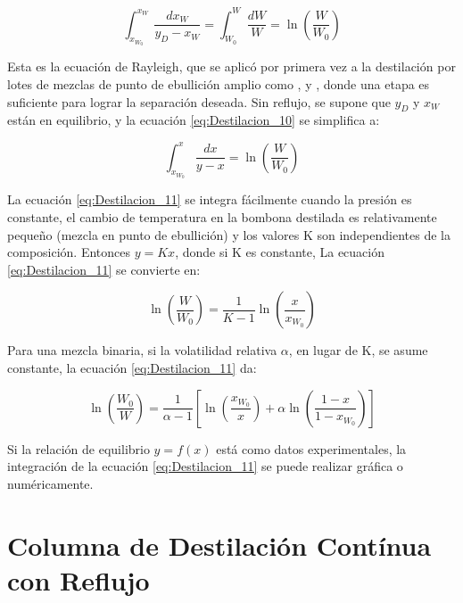 \documentclass[11pt]{book}
\begin{document}
\begin{equation}
    \label{eq:Destilacion_10}
    \int_{x_{W_0}}^{x_W} \frac{dx_W}{y_D-x_W} = \int_{W_0}^{W} \frac{dW}{W} = \ln \left( \frac{W}{W_0} \right)
\end{equation}
 
Esta es la ecuación de Rayleigh, que se aplicó por primera vez a la destilación por lotes de mezclas de punto de ebullición amplio como ,  y , donde una etapa es suficiente para lograr la separación deseada. Sin reflujo, se supone que $y_D$ y $x_W$ están en equilibrio, y la ecuación \ref{eq:Destilacion_10} se simplifica a:

\begin{equation}
    \label{eq:Destilacion_11}
    \int_{x_{W_0}}^{x} \frac{dx}{y-x} = \ln \left( \frac{W}{W_0} \right)
\end{equation}

La ecuación \ref{eq:Destilacion_11} se integra fácilmente cuando la presión es constante, el cambio de temperatura en la bombona destilada es relativamente pequeño (mezcla en punto de ebullición) y los valores K son independientes de la composición. Entonces $y = Kx$, donde si K es constante, La ecuación \ref{eq:Destilacion_11} se convierte en:

\begin{equation}
    \label{eq:Destilacion_12}
    \ln \left( \frac{W}{W_0} \right) = \frac{1}{K-1} \ln \left( \frac{x}{x_{W_0}} \right)
\end{equation}

Para una mezcla binaria, si la volatilidad relativa $\alpha$, en lugar de K, se asume constante, la ecuación \ref{eq:Destilacion_11} da:

\begin{equation}
    \label{eq:Destilacion_13}
    \ln \left( \frac{W_0}{W} \right) = \frac{1}{\alpha - 1} \left[ \ln \left( \frac{x_{W_0}}{x} \right) + \alpha \ln \left( \frac{1-x}{1-x_{W_0}} \right) \right]
\end{equation}

Si la relación de equilibrio $y = f(x)$ está como datos experimentales, la integración de la ecuación \ref{eq:Destilacion_11} se puede realizar gráfica o numéricamente.

\section{Columna de Destilación Contínua con Reflujo}
\end{document}
